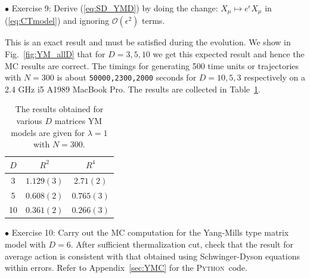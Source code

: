 \documentclass[letter,11pt]{article}
\newcommand{\PY}{\textsc{Python}}
\begin{document}
\begin{mdframed}[backgroundcolor=blue!3] 
	$\bullet$ Exercise 9: Derive (\ref{eq:SD_YMD}) by doing the change: $X_{\mu} \mapsto e^{\epsilon}X_{\mu}$ in (\ref{eq:CTmodel}) and ignoring 
	$\mathcal{O}(\epsilon^{2})$ terms.
\end{mdframed}
This is an exact result and must be satisfied during the evolution. We show in Fig.~\ref{fig:YM_allD} that for 
$D=3,5,10$ we get this expected result and hence the MC results are correct. The timings for generating 500 time units or trajectories 
with $N=300$ is about \texttt{50000,2300,2000} seconds for $D = 10, 5, 3$ respectively on 
a 2.4 GHz i5 A1989 MacBook Pro. The results are collected in Table~\ref{table:D_YM_data}. 
\begin{table}[h!]
	\centering
	\begin{tabular}{||c c c||} 
		\hline
		$D$ & $R^2$ & $R^4$ \\ [0.5ex] 
		\hline\hline
		3 & $1.129(3) $ & $2.71(2) $  \\ 
		5 & $0.608(2) $ & $0.765(3) $  \\
		10 & $0.361(2)$ & $0.266(3)$
		 \\ [1ex] 
		\hline 
	\end{tabular}
\caption{The results obtained for various $D$ matrices YM models are given for $\lambda=1$ with $N=300$.}
\label{table:D_YM_data}
\end{table}
\begin{mdframed}[backgroundcolor=blue!3] 
	$\bullet$ Exercise 10: Carry out the MC computation for the Yang-Mills type matrix model with $D=6$. After sufficient thermalization cut, check that the result for average action is consistent with that obtained using Schwinger-Dyson equations within errors. Refer to Appendix~\ref{sec:YMC} for the \PY~code.
\end{mdframed} 
\end{document}
